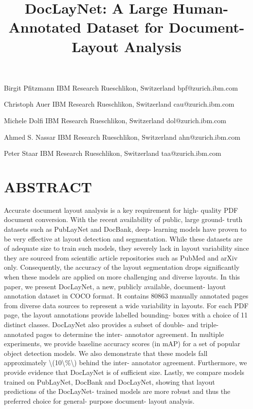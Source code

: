 \documentclass[11pt,a4paper]{article}
\title{DocLayNet: A Large Human-Annotated Dataset for Document-Layout Analysis}
\begin{document}
\maketitle

Birgit Pfitzmann IBM Research Rueschlikon, Switzerland bpf@zurich.ibm.com

Christoph Auer IBM Research Rueschlikon, Switzerland cau@zurich.ibm.com

Michele Dolfi IBM Research Rueschlikon, Switzerland dol@zurich.ibm.com

Ahmed S. Nassar IBM Research Rueschlikon, Switzerland ahn@zurich.ibm.com

Peter Staar IBM Research Rueschlikon, Switzerland taa@zurich.ibm.com

\section{ABSTRACT}

Accurate document layout analysis is a key requirement for high- quality PDF document conversion. With the recent availability of public, large ground- truth datasets such as PubLayNet and DocBank, deep- learning models have proven to be very effective at layout detection and segmentation. While these datasets are of adequate size to train such models, they severely lack in layout variability since they are sourced from scientific article repositories such as PubMed and arXiv only. Consequently, the accuracy of the layout segmentation drops significantly when these models are applied on more challenging and diverse layouts. In this paper, we present DocLayNet, a new, publicly available, document- layout annotation dataset in COCO format. It contains 80863 manually annotated pages from diverse data sources to represent a wide variability in layouts. For each PDF page, the layout annotations provide labelled bounding- boxes with a choice of 11 distinct classes. DocLayNet also provides a subset of double- and triple- annotated pages to determine the inter- annotator agreement. In multiple experiments, we provide baseline accuracy scores (in mAP) for a set of popular object detection models. We also demonstrate that these models fall approximately \textbackslash{}(10\textbackslash{}\%\textbackslash{}) behind the inter- annotator agreement. Furthermore, we provide evidence that DocLayNet is of sufficient size. Lastly, we compare models trained on PubLayNet, DocBank and DocLayNet, showing that layout predictions of the DocLayNet- trained models are more robust and thus the preferred choice for general- purpose document- layout analysis.
\end{document}
